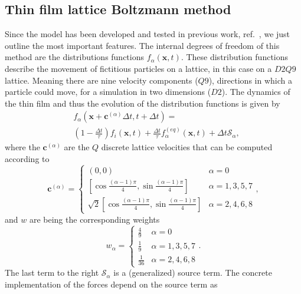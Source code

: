 \documentclass[twocolumn,amsmath,amssymb,showpacs,pre,nofootinbib,superscriptaddress]{revtex4-1} %
\begin{document}
\subsection{Thin film lattice Boltzmann method}\label{subsec:LBM}
Since the model has been developed and tested in previous work, ref.~\cite{PhysRevE.100.033313}, we just outline the most important features.
The internal degrees of freedom of this method are the distributions functions $f_{\alpha}(\mathbf{x},t)$.
These distribution functions describe the movement of fictitious particles on a lattice, in this case on a $D2Q9$ lattice.
Meaning there are nine velocity components ($Q9$), directions in which a particle could move, for a simulation in two dimensions ($D2$).
The dynamics of the thin film and thus the evolution of the distribution functions is given by
\begin{equation}\label{eq:LBE}
    \begin{split}
        &f_{\alpha}(\mathbf{x}+\mathbf{c}^{({\alpha})}\Delta t,t+\Delta t) = \\
        &\left(1 - \frac{\Delta t}{\tau}\right) f_i(\mathbf{x},t) + \frac{\Delta t}{\tau} f_{\alpha}^{(eq)}(\mathbf{x},t) + \Delta t\mathcal{S}_{\alpha},
    \end{split}
\end{equation}
where the $\mathbf{c}^{({\alpha})}$ are the $Q$ discrete lattice velocities that can be computed according to
\begin{equation}\label{eq:speeds}
\mathbf{c}^{({\alpha})}  =
\left\{
\begin{array}{ll}
(0,0) & \alpha = 0 \\
\left[\cos{\frac{(\alpha-1)\pi}{4}}, \sin{\frac{(\alpha-1)\pi}{4}} \right] &  \alpha=1,3,5,7 \\
\sqrt{2}\left[\cos{\frac{(\alpha-1)\pi}{4}}, \sin{\frac{(\alpha-1)\pi}{4}} \right] & \alpha=2,4,6,8
\end{array}
\right.,
\end{equation}
and $w$ are being the corresponding weights
\begin{equation}
w_{\alpha}  =
\left\{
\begin{array}{ll}
\frac{4}{9} & \alpha = 0 \\
\frac{1}{9} &  \alpha=1,3,5,7 \\
\frac{1}{36} & \alpha=2,4,6,8
\end{array}
\right..
\end{equation}
The last term to the right $\mathcal{S}_{\alpha}$ is a (generalized) source term.
The concrete implementation of the forces depend on the source term as~\cite{https://doi.org/10.1002/fld.4726}
\end{document}
